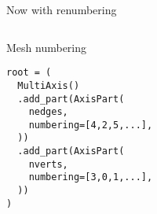 \documentclass{beamer}
\newcommand{\checked}{\makebox[0pt][l]{$\square$}\raisebox{.15ex}{\hspace{0.1em}$\checkmark$}}
\begin{document}
\begin{frame}[fragile]{Now with renumbering}
\begin{columns}
    \hfill

    \begin{column}{.5\textwidth}
      \checked Mesh numbering

      \vspace{2em}

      \begin{verbatim}
root = (
  MultiAxis()
  .add_part(AxisPart(
    nedges,
    numbering=[4,2,5,...],
  ))
  .add_part(AxisPart(
    nverts,
    numbering=[3,0,1,...],
  ))
)
      \end{verbatim}
    \end{column}
  \end{columns}
\end{frame}
\end{document}
